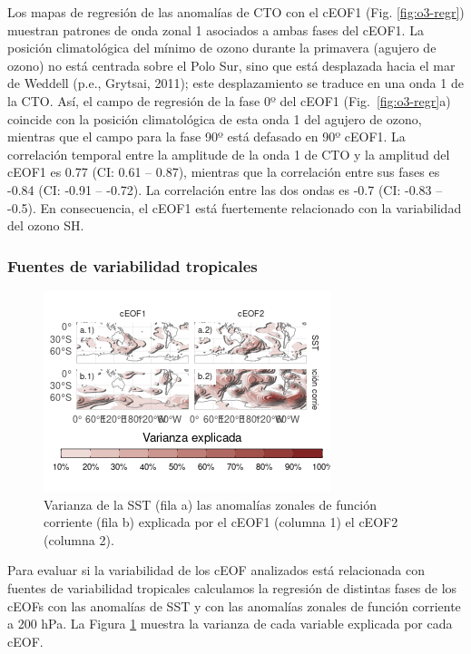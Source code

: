 \documentclass[12pt,oneside]{reedthesis}
\begin{document}
Los mapas de regresión de las anomalías de CTO con el cEOF1 (Fig. \ref{fig:o3-regr}) muestran patrones de onda zonal 1 asociados a ambas fases del cEOF1.
La posición climatológica del mínimo de ozono durante la primavera (agujero de ozono) no está centrada sobre el Polo Sur, sino que está desplazada hacia el mar de Weddell (p.e., Grytsai, 2011); este desplazamiento se traduce en una onda 1 de la CTO.
Así, el campo de regresión de la fase 0º del cEOF1 (Fig.~\ref{fig:o3-regr}a) coincide con la posición climatológica de esta onda 1 del agujero de ozono, mientras que el campo para la fase 90º está defasado en 90º cEOF1.
La correlación temporal entre la amplitude de la onda 1 de CTO y la amplitud del cEOF1 es 0.77 (CI: 0.61 -- 0.87), mientras que la correlación entre sus fases es -0.84 (CI: -0.91 -- -0.72).
La correlación entre las dos ondas es -0.7 (CI: -0.83 -- -0.5).
En consecuencia, el cEOF1 está fuertemente relacionado con la variabilidad del ozono SH.

\hypertarget{fuentes-de-variabilidad-tropicales}{%
\subsubsection{Fuentes de variabilidad tropicales}\label{fuentes-de-variabilidad-tropicales}}



\begin{figure}
\includegraphics{figures/20-ceofs/psi-sst-explained-variance-1} \caption{Varianza de la SST (fila a) las anomalías zonales de función corriente (fila b) explicada por el cEOF1 (columna 1) el cEOF2 (columna 2).}\label{fig:psi-sst-explained-variance}
\end{figure}

Para evaluar si la variabilidad de los cEOF analizados está relacionada con fuentes de variabilidad tropicales calculamos la regresión de distintas fases de los cEOFs con las anomalías de SST y con las anomalías zonales de función corriente a 200 hPa.
La Figura \ref{fig:psi-sst-explained-variance} muestra la varianza de cada variable explicada por cada cEOF.
\end{document}
